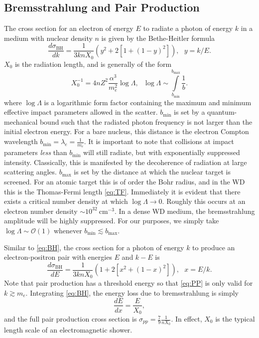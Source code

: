 \documentclass[twocolumn,showpacs,preprintnumbers,amsmath,amssymb,prd]{revtex4}
\newcommand{\OO}{\mathcal{O}}
\begin{document}
\begin{appendices}
\subsection*{Bremsstrahlung and Pair Production}
The cross section for an electron of energy $E$ to radiate a photon of energy $k$ in a medium with nuclear density $n$ is given by the Bethe-Heitler formula
\begin{equation}
\label{eq:BH}
\frac{d \sigma_\text{BH}}{dk} = \frac{1}{3 k n X_0} (y^2+2 [1+ (1-y)^2]), ~~~ y = k/E.
\end{equation}
$X_0$ is the radiation length, and is generally of the form
\begin{equation}
X_0^{-1} = 4 n Z^2 \frac{\alpha^3}{m_e^2} \log{\Lambda}, ~~~ \log{\Lambda} \sim \int \limits_{b_\text{min}}^{b_\text{max}} \frac{1}{b}. 
\end{equation}
where $\log{\Lambda}$ is a logarithmic form factor containing the maximum and minimum effective impact parameters allowed in the scatter. $b_\text{min}$ is set by a quantum-mechanical bound such that the radiated photon frequency is not larger than the initial electron energy. For a bare nucleus, this distance is the electron Compton wavelength $b_\text{min} = \lambda_e = \frac{1}{m_e}$. It is important to note that collisions at impact parameters \emph{less} than $b_\text{min}$ will still radiate, but with exponentially suppressed intensity. Classically, this is manifested by the decoherence of radiation at large scattering angles. $b_\text{max}$ is set by the distance at which the nuclear target is screened. For an atomic target this is of order the Bohr radius, and in the WD this is the Thomas-Fermi length \eqref{eq:TF}. Immediately it is evident that there exists a critical number density at which $\log \Lambda \to 0$. Roughly this occurs at an electron number density $\sim 10^{32} ~\text{cm}^{-3}$. In a dense WD medium, the bremsstrahlung amplitude will be highly suppressed. For our purposes, we simply take $\log{\Lambda} \sim \OO(1)$ whenever $b_\text{min} \lesssim b_\text{max}$. 

Similar to \eqref{eq:BH}, the cross section for a photon of energy $k$ to produce an electron-positron pair with energies $E$ and $k-E$ is
\begin{equation}
\label{eq:PP}
\frac{d \sigma_\text{BH}}{dE} = \frac{1}{3 k n X_0} (1+ 2[x^2+ (1-x)^2]), ~~~ x = E/k.
\end{equation} 
Note that pair production has a threshold energy so that \eqref{eq:PP} is only valid for $k \gtrsim m_e$. Integrating \eqref{eq:BH}, the energy loss due to bremsstrahlung is simply
\begin{equation}
\frac{dE}{dx} = \frac{E}{X_0},
\end{equation}
and the full pair production cross section is $\sigma_{pp} = \frac{7}{9} \frac{1}{n X_0}$. In effect, $X_0$ is the typical length scale of an electromagnetic shower. 


\end{appendices}
\end{document}
